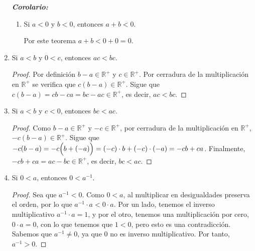 \documentclass[11pt]{article}
\newcommand{\R}{\mathbb{R}}
\newcommand{\bfit}[1]{\textbf{\textit{#1}}}
\begin{document}
\begin{enumerate}[label=\alph*)]
 \bfit{Corolario:}\begin{enumerate}[label=\roman*)]
%
  \item Si $a<0$ y $b<0$, entonces $a+b<0$.%
  
  Por este teorema $a+b<0+0=0$.
 \end{enumerate}

 \item Si $a<b$ y $0<c$, entonces $ac<bc$.%
 
 \begin{proof} 
  Por definición $b-a \in\R^+$ y $c \in\R^+$. Por cerradura de la multiplicación en $\R^+$ se verifica que $c(b-a) \in\R^+$. Sigue que $c(b-a)=cb-ca=bc-ac \in\R^+$, es decir, $ac<bc$. 
 \end{proof}
%

 \item Si $a<b$ y $c<0$, entonces $bc<ac$.%
 
 \begin{proof} 
 Como $b-a\in\R^+$ y $-c\in\R^+$, por cerradura de la multiplicación en $\R^+$, $-c(b-a) \in\R^+$. Sigue que $-c(b-a)= -c \Bigl( b + (-a) \Bigr)=(-c) \cdot b + (-c) \cdot (-a)=-cb +ca $. Finalmente, $-cb +ca=ac - bc \in\R^+$, es decir, $bc<ac$. 
 \end{proof}

 \item Si $0<a$, entonces $0<a^{-1}$.%
 \begin{proof} 
 Sea que $a^{-1}<0$. Como $0<a$, al multiplicar en desigualdades preserva el orden, por lo que $a^{-1} \cdot a<0 \cdot a$. Por un lado, tenemos el inverso multiplicativo $a^{-1} \cdot a = 1$, y por el otro, tenemos una multiplicación por cero, $0\cdot a=0$, con lo que tenemos que $1<0$, pero esto es una contradicción. Sabemos que $a^{-1}\neq 0$, ya que $0$ no es inverso multiplicativo. Por tanto, $a^{-1}>0$.
 \end{proof}


\end{enumerate}
\end{document}
